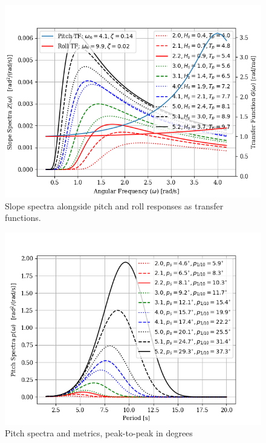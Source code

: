 \documentclass[11pt, letterpaper]{article}
\begin{document}
\begin{figure}[hbt!]
\centering
\includegraphics[width=\RFW\linewidth]{cusv/slope_respover.png}
\caption{Slope spectra alongside pitch and roll responses as transfer functions.}
\label{f:slope_respover}
\end{figure}

\begin{figure}[hbt!]
\centering
\includegraphics[width=\RFW\linewidth]{cusv/pitchresp.png}
\caption{Pitch spectra and metrics, peak-to-peak in degrees}
\label{f:pitchresp}
\end{figure}
\end{document}
